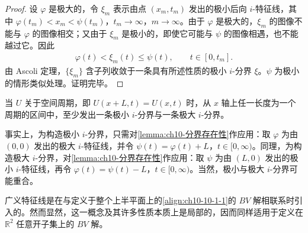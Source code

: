 \documentclass[../../main.tex]{subfiles}
\begin{document}
\begin{proof}
设 $\varphi$ 是极大的，令 $\xi_{m}$ 表示由点 $(x_{m},t_{m})$ 发出的极小后向 $i$-特征线，其中 $\varphi(t_{m})<x_{m}<\psi(t_{m})$，$t_{m}\to\infty$，$m\to\infty$。由于 $\varphi$ 是极大的，$\xi_{m}$ 的图像不能与 $\varphi$ 的图像相交；又由于 $\xi_{m}$ 是极小的，即使它可能与 $\psi$ 的图像相遇，也不能越过它。因此
\begin{align*}
\varphi(t)<\xi_{m}(t)\leqslant\psi(t),\qquad t\in[0,t_{m}].
\end{align*}
由 Ascoli 定理，$\{\xi_{m}\}$ 含子列收敛于一条具有所述性质的极小 $i$-分界 $\xi$。$\psi$ 为极小的情形类似处理。证明完毕。
\end{proof}

\begin{corollary}\label{corollary:ch10-周期解的分界}
当 $U$ 关于空间周期，即 $U(x+L,t)=U(x,t)$ 时，从 $x$ 轴上任一长度为一个周期的区间中，至少发出一条极小 $i$-分界与一条极大 $i$-分界。
\end{corollary}

事实上，为构造极小 $i$-分界，只需对\cref{lemma:ch10-分界存在性}作应用：取 $\varphi$ 为由 $(0,0)$ 发出的极大 $i$-特征线，并令 $\psi(t)=\varphi(t)+L$，$t\in[0,\infty)$。同理，为构造极大 $i$-分界，对\cref{lemma:ch10-分界存在性}作应用：取 $\psi$ 为由 $(L,0)$ 发出的极小 $i$-特征线，再令 $\varphi(t)=\psi(t)-L$，$t\in[0,\infty)$。当然，极小与极大 $i$-分界可能重合。

\begin{remark}[本章结语]\label{remark:ch10-局部性注记}
广义特征线是在与定义于整个上半平面上的\eqref{align:ch10-10-1-1}的 $BV$ 解相联系时引入的。然而显然，这一概念及其许多性质本质上是局部的，因而同样适用于定义在 $\mathbb{R}^{2}$ 任意开子集上的 $BV$ 解。
\end{remark}
\end{document}
